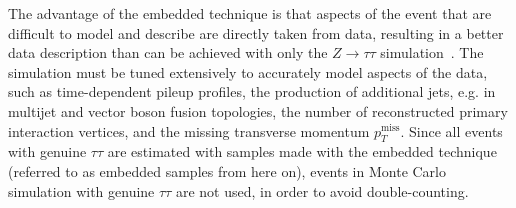 The advantage of the embedded technique is that aspects of the event that are difficult to model and describe are directly taken from data, resulting in a better data description than can be achieved with only the $Z \rightarrow \tau\tau$ simulation~\cite{CMS-TAU-18-001}. The simulation must be tuned extensively to accurately model aspects of the data, such as time-dependent pileup profiles, the production of additional jets, e.g. in multijet and vector boson fusion topologies, the number of reconstructed primary interaction vertices, and the missing transverse momentum $p_{T}^{\text{miss}}$. Since all events with genuine $\tau\tau$ are estimated with samples made with the embedded technique (referred to as embedded samples from here on), events in Monte Carlo simulation with genuine $\tau\tau$ are not used, in order to avoid double-counting.